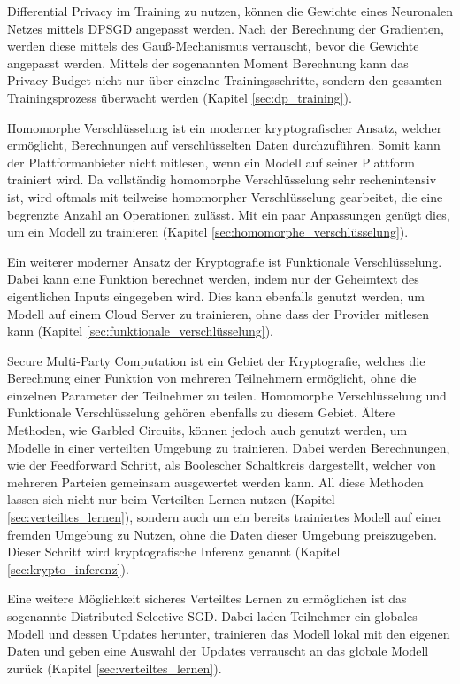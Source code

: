 Differential Privacy im Training zu nutzen, können die Gewichte eines Neuronalen Netzes mittels DPSGD angepasst werden.
Nach der Berechnung der Gradienten, werden diese mittels des Gauß-Mechanismus verrauscht, bevor die Gewichte angepasst werden.
Mittels der sogenannten Moment Berechnung kann das Privacy Budget nicht nur über einzelne Trainingsschritte, sondern den gesamten Trainingsprozess überwacht werden (Kapitel \ref{sec:dp_training}).

Homomorphe Verschlüsselung ist ein moderner kryptografischer Ansatz, welcher ermöglicht, Berechnungen auf verschlüsselten Daten durchzuführen.
Somit kann der Plattformanbieter nicht mitlesen, wenn ein Modell auf seiner Plattform trainiert wird.
Da vollständig homomorphe Verschlüsselung sehr rechenintensiv ist, wird oftmals mit teilweise homomorpher Verschlüsselung gearbeitet, die eine begrenzte Anzahl an Operationen zulässt.
Mit ein paar Anpassungen genügt dies, um ein Modell zu trainieren (Kapitel \ref{sec:homomorphe_verschlüsselung}).

Ein weiterer moderner Ansatz der Kryptografie ist Funktionale Verschlüsselung.
Dabei kann eine Funktion berechnet werden, indem nur der Geheimtext des eigentlichen Inputs eingegeben wird.
Dies kann ebenfalls genutzt werden, um Modell auf einem Cloud Server zu trainieren, ohne dass der Provider mitlesen kann (Kapitel \ref{sec:funktionale_verschlüsselung}).

Secure Multi-Party Computation ist ein Gebiet der Kryptografie, welches die Berechnung einer Funktion von mehreren Teilnehmern ermöglicht, ohne die einzelnen Parameter der Teilnehmer zu teilen.
Homomorphe Verschlüsselung und Funktionale Verschlüsselung gehören ebenfalls zu diesem Gebiet.
Ältere Methoden, wie Garbled Circuits, können jedoch auch genutzt werden, um Modelle in einer verteilten Umgebung zu trainieren. 
Dabei werden Berechnungen, wie der Feedforward Schritt, als Boolescher Schaltkreis dargestellt, welcher von mehreren Parteien gemeinsam ausgewertet werden kann.
All diese Methoden lassen sich nicht nur beim Verteilten Lernen nutzen (Kapitel \ref{sec:verteiltes_lernen}), sondern auch um ein bereits trainiertes Modell auf einer fremden Umgebung zu Nutzen, ohne die Daten dieser Umgebung preiszugeben. 
Dieser Schritt wird kryptografische Inferenz genannt (Kapitel \ref{sec:krypto_inferenz}). 

Eine weitere Möglichkeit sicheres Verteiltes Lernen zu ermöglichen ist das sogenannte Distributed Selective SGD. 
Dabei laden Teilnehmer ein globales Modell und dessen Updates herunter, trainieren das Modell lokal mit den eigenen Daten und geben eine Auswahl der Updates verrauscht an das globale Modell zurück (Kapitel \ref{sec:verteiltes_lernen}).

